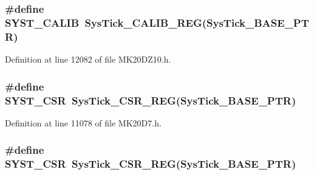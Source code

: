 \subsubsection[{\texorpdfstring{S\+Y\+S\+T\+\_\+\+C\+A\+L\+IB}{SYST_CALIB}}]{\setlength{\rightskip}{0pt plus 5cm}\#define S\+Y\+S\+T\+\_\+\+C\+A\+L\+IB~{\bf Sys\+Tick\+\_\+\+C\+A\+L\+I\+B\+\_\+\+R\+EG}({\bf Sys\+Tick\+\_\+\+B\+A\+S\+E\+\_\+\+P\+TR})}\hypertarget{group___sys_tick___register___accessor___macros_ga2d37582dd39f59744e340cce09230250}{}\label{group___sys_tick___register___accessor___macros_ga2d37582dd39f59744e340cce09230250}


Definition at line 12082 of file M\+K20\+D\+Z10.\+h.

\subsubsection[{\texorpdfstring{S\+Y\+S\+T\+\_\+\+C\+SR}{SYST_CSR}}]{\setlength{\rightskip}{0pt plus 5cm}\#define S\+Y\+S\+T\+\_\+\+C\+SR~{\bf Sys\+Tick\+\_\+\+C\+S\+R\+\_\+\+R\+EG}({\bf Sys\+Tick\+\_\+\+B\+A\+S\+E\+\_\+\+P\+TR})}\hypertarget{group___sys_tick___register___accessor___macros_gab26b3fc75982181f81b185b206e897f6}{}\label{group___sys_tick___register___accessor___macros_gab26b3fc75982181f81b185b206e897f6}


Definition at line 11078 of file M\+K20\+D7.\+h.

\subsubsection[{\texorpdfstring{S\+Y\+S\+T\+\_\+\+C\+SR}{SYST_CSR}}]{\setlength{\rightskip}{0pt plus 5cm}\#define S\+Y\+S\+T\+\_\+\+C\+SR~{\bf Sys\+Tick\+\_\+\+C\+S\+R\+\_\+\+R\+EG}({\bf Sys\+Tick\+\_\+\+B\+A\+S\+E\+\_\+\+P\+TR})}\hypertarget{group___sys_tick___register___accessor___macros_gab26b3fc75982181f81b185b206e897f6}{}\label{group___sys_tick___register___accessor___macros_gab26b3fc75982181f81b185b206e897f6}



